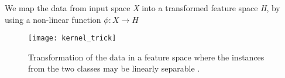 We map the data from input space \textit{X} into a transformed feature space \textit{H}, by using a non-linear function $\phi: X \rightarrow H$

\begin{figure}[H]
	\centering
	\texttt{[image: kernel\_trick]}
	\caption{Transformation of the data in a feature space where the instances from the two classes may be linearly separable \cite{kernel_trick}.}
\end{figure} 

